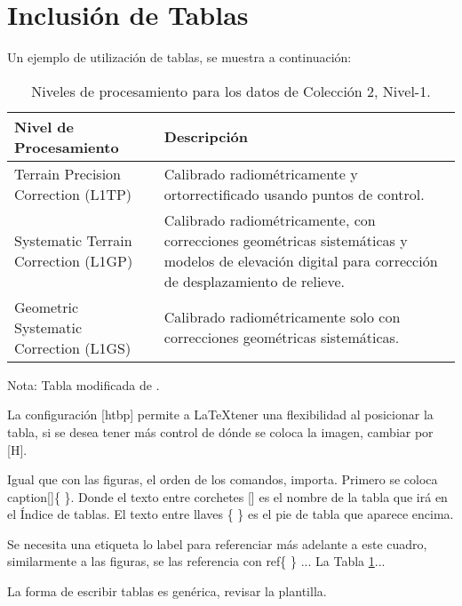 \section{Inclusión de Tablas}

Un ejemplo de utilización de tablas, se muestra a continuación:

\begin{table}[htbp]
	\centering
	\begin{threeparttable}
		\caption[Niveles de procesamiento para los datos de Colección 2, Nivel-1.]{Niveles de procesamiento para los datos de Colección 2, Nivel-1.}
		\label{tabla:ejemplo}
		\begin{tabular}{ m{5cm}  m{10cm} }
			\hline
			\textbf{Nivel de Procesamiento} & \textbf{Descripción} \\
			\hline
			Terrain Precision Correction (L1TP) & Calibrado radiométricamente y ortorrectificado usando puntos de control. \\
			\hline
			Systematic Terrain Correction (L1GP) & Calibrado radiométricamente, con correcciones geométricas sistemáticas y modelos de elevación digital para corrección de desplazamiento de relieve. \\
			\hline
			Geometric Systematic Correction (L1GS) & Calibrado radiométricamente solo con correcciones geométricas sistemáticas. \\
			\hline
		\end{tabular}
		\begin{tablenotes}
			\item Nota: Tabla modificada de \parencite{motschmann2021water}.
		\end{tablenotes}
	\end{threeparttable}
\end{table}

La configuración [htbp] permite a \LaTeX tener una flexibilidad al posicionar la tabla, si se desea tener más control de dónde se coloca la imagen, cambiar por [H].

Igual que con las figuras, el orden de los comandos, importa. Primero se coloca caption[]\{ \}. Donde el texto entre corchetes [] es el nombre de la tabla que irá en el Índice de tablas. El texto entre llaves \{ \} es el pie de tabla que aparece encima.

Se necesita una etiqueta lo label para referenciar más adelante a este cuadro, similarmente a las figuras, se las referencia con ref\{ \} ... La Tabla \ref{tabla:ejemplo}...

La forma de escribir tablas es genérica, revisar la plantilla.

